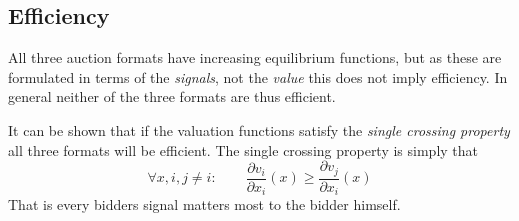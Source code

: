 \subsection{Efficiency}
All three auction formats have increasing equilibrium functions, but as these are formulated in terms of the \textit{signals}, not the \textit{value} this does not imply efficiency. In general neither of the three formats are thus efficient. 

It can be shown that if the valuation functions satisfy the \textit{single crossing property} all three formats will be efficient. The single crossing property is simply that 
\begin{equation}
\forall x,i, j\neq i: \qquad  \frac{\partial v_i}{\partial x_i}(x) \geq  \frac{\partial v_j}{\partial x_i}(x)
\end{equation}
That is every bidders signal matters most to the bidder himself. 